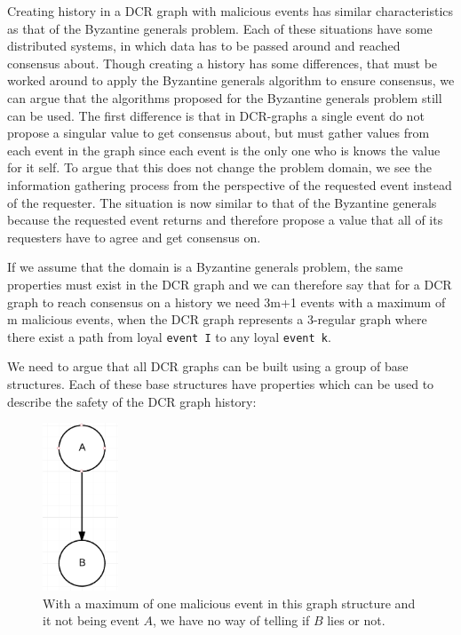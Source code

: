 \newpar Creating history in a DCR graph with malicious events has similar characteristics as that of the Byzantine generals problem\cite{byzantinegeneralsproblem}. Each of these situations have some distributed systems, in which data has to be passed around and reached consensus about. Though creating a history has some differences, that must be worked around to apply the Byzantine generals algorithm to ensure consensus, we can argue that the algorithms proposed for the Byzantine generals problem still can be used. The first difference is that in DCR-graphs a single event do not propose a singular value to get consensus about, but must gather values from each event in the graph since each event is the only one who is knows the value for it self. To argue that this does not change the problem domain, we see the information gathering process from the perspective of the requested event instead of the requester. The situation is now similar to that of the Byzantine generals because the requested event returns and therefore propose a value that all of its requesters have to agree and get consensus on.

\newpar If we assume that the domain is a Byzantine generals problem, the same properties must exist in the DCR graph and we can therefore say that for a DCR graph to reach consensus on a history we need 3m+1 events with a maximum of m malicious events, when the DCR graph represents a 3-regular graph where there exist a path from loyal \texttt{event I} to any loyal \texttt{event k}.

We need to argue that all DCR graphs can be built using a group of base structures. Each of these base structures have properties which can be used to describe the safety of the DCR graph history:

\begin{figure}[H]
	\centering
	\includegraphics[height=5cm]{figures/GraphStructure_OneToOne}
	\caption{With a maximum of one malicious event in this graph structure and it not being event $A$, we have no way of telling if $B$ lies or not.}
\end{figure}

